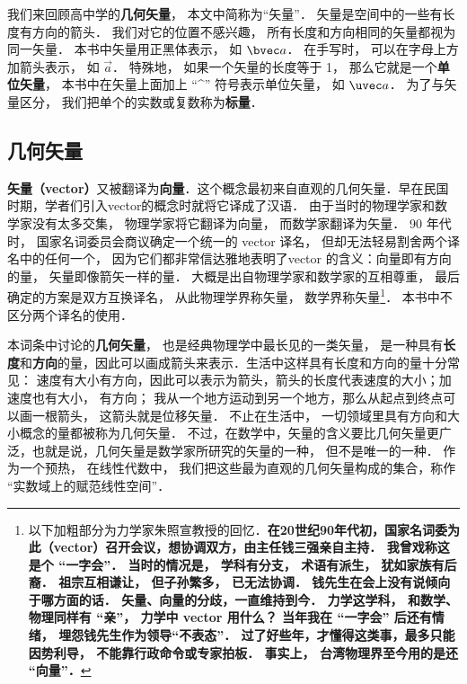 

我们来回顾高中学的\textbf{几何矢量}， 本文中简称为“矢量”． 矢量是空间中的一些有长度有方向的箭头． 我们对它的位置不感兴趣， 所有长度和方向相同的矢量都视为同一矢量． 本书中矢量用正黑体表示， 如 $\bvec a$． 在手写时， 可以在字母上方加箭头表示， 如 $\overrightarrow{a}$． 特殊地， 如果一个矢量的长度等于 1， 那么它就是一个\textbf{单位矢量}， 本书中在矢量上面加上 “\^{}” 符号表示单位矢量， 如 $\uvec a$． 为了与矢量区分， 我们把单个的实数或复数称为\textbf{标量}．

\subsection{几何矢量}

\textbf{矢量（vector）}又被翻译为\textbf{向量}．这个概念最初来自直观的几何矢量．早在民国时期，学者们引入vector的概念时就将它译成了汉语． 由于当时的物理学家和数学家没有太多交集， 物理学家将它翻译为向量， 而数学家翻译为矢量． 90 年代时， 国家名词委员会商议确定一个统一的 vector 译名， 但却无法轻易割舍两个译名中的任何一个， 因为它们都非常信达雅地表明了vector 的含义：向量即有方向的量， 矢量即像箭矢一样的量． 大概是出自物理学家和数学家的互相尊重， 最后确定的方案是双方互换译名， 从此物理学界称矢量， 数学界称矢量\footnote{以下加粗部分为力学家朱照宣教授的回忆．\textbf{在20世纪90年代初，国家名词委为此（vector）召开会议，想协调双方，由主任钱三强亲自主持． 我曾戏称这是个 “一字会”． 当时的情况是， 学科有分支， 术语有派生， 犹如家族有后裔． 祖宗互相谦让， 但子孙繁多， 已无法协调． 钱先生在会上没有说倾向于哪方面的话． 矢量、向量的分歧，一直维持到今． 力学这学科， 和数学、物理同样有 “亲”， 力学中 vector 用什么？ 当年我在 “一字会” 后还有情绪， 埋怨钱先生作为领导“不表态”． 过了好些年，才懂得这类事，最多只能因势利导， 不能靠行政命令或专家拍板． 事实上， 台湾物理界至今用的是还 “向量”．}}． 本书中不区分两个译名的使用．

本词条中讨论的\textbf{几何矢量}， 也是经典物理学中最长见的一类矢量， 是一种具有\textbf{长度}和\textbf{方向}的量，因此可以画成箭头来表示．生活中这样具有长度和方向的量十分常见： 速度有大小有方向，因此可以表示为箭头，箭头的长度代表速度的大小；加速度也有大小， 有方向； 我从一个地方运动到另一个地方，那么从起点到终点可以画一根箭头， 这箭头就是位移矢量． 不止在生活中， 一切领域里具有方向和大小概念的量都被称为几何矢量． 不过，在数学中，矢量的含义要比几何矢量更广泛，也就是说，几何矢量是数学家所研究的矢量的一种， 但不是唯一的一种． 作为一个预热， 在线性代数中， 我们把这些最为直观的几何矢量构成的集合，称作 “实数域上的赋范线性空间”．

